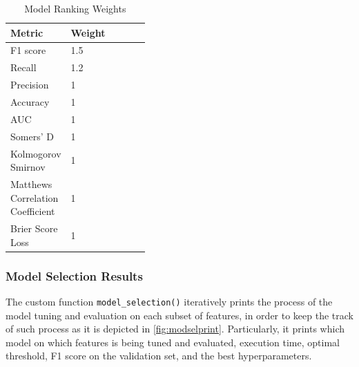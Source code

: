 \begin{table}[H]
\small
\setlength{\tabcolsep}{8pt}
\renewcommand{\arraystretch}{1.3}
\centering
    \caption[Model Ranking Weights]{Model Ranking Weights}\label{tab:weightsrank}
    \begin{tabular}{>{\raggedleft\arraybackslash}p{0.4\linewidth} l}
\toprule
\textbf{Metric} & \textbf{Weight}\\
\midrule
\hline
F1 score & 1.5 \\
Recall & 1.2 \\
Precision & 1 \\
Accuracy & 1 \\
AUC & 1 \\
Somers' D & 1 \\ 
Kolmogorov Smirnov & 1 \\
Matthews Correlation Coefficient  & 1 \\
Brier Score Loss  & 1 \\
\hline
\bottomrule
\end{tabular}
\vspace{0.7em}

\vspace{-1em}
\end{table}




\newpage
\subsubsection{Model Selection Results}



The custom function \lstinline{model_selection()} iteratively prints the process of the model tuning and evaluation on each subset of features, in order to keep the track of such process as it is depicted in \autoref{fig:modselprint}.
Particularly, it prints which model on which features is being tuned and evaluated, execution time, optimal threshold, F1 score on the validation set, and the best hyperparameters.

